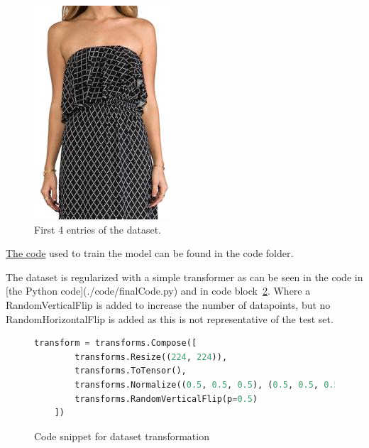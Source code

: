 \documentclass{article}
\begin{document}
\begin{figure}[ht]
\begin{minipage}[b]{0.2\linewidth}
        \includegraphics[width=\linewidth]{imgs/00003.jpg}
    \end{minipage}
    \caption{First 4 entries of the dataset.}
    \label{fig:four_images}
\end{figure}

\href{./code/finalCode.py}{The code} used to train the model can be found in the code folder.

The dataset is regularized with a simple transformer as can be seen in the code in [the Python code](./code/finalCode.py) and in code block~\ref{fig:transform_code}. Where a RandomVerticalFlip is added to increase the number of datapoints, but no RandomHorizontalFlip is added as this is not representative of the test set. 

\begin{figure}[ht]
    \centering
    \begin{lstlisting}[language=Python]
    transform = transforms.Compose([
        transforms.Resize((224, 224)),
        transforms.ToTensor(),
        transforms.Normalize((0.5, 0.5, 0.5), (0.5, 0.5, 0.5)),
        transforms.RandomVerticalFlip(p=0.5)
    ])
    \end{lstlisting}
    \caption{Code snippet for dataset transformation}
    \label{fig:transform_code}
\end{figure}
\end{document}
